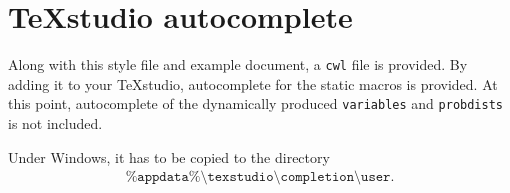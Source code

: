 \documentclass
[
twoside, %
]
{article}
\newcommand{\eq}[1]{\begin{align*}#1\end{align*}}
\begin{document}
\section{\TeX studio autocomplete}
Along with this style file and example document, a \texttt{cwl} file is provided. By adding it to your \TeX studio, autocomplete for the static macros is provided. At this point, autocomplete of the dynamically produced \texttt{variables} and \texttt{probdists} is not included.

Under Windows, it has to be copied to the directory \eq{\texttt{\%appdata\%\textbackslash texstudio\textbackslash completion\textbackslash user}.} 
\end{document}
